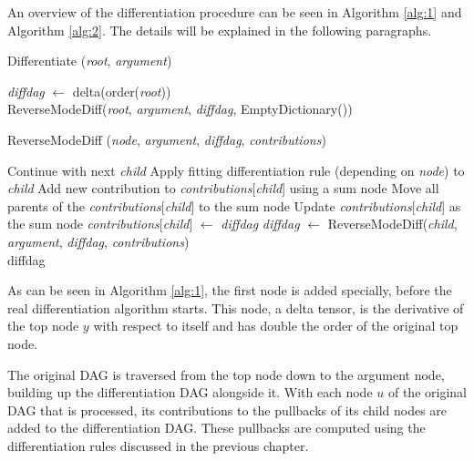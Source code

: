 \documentclass[12pt, a4paper]{report}
\begin{document}
An overview of the differentiation procedure can be seen in Algorithm \ref{alg:1} and Algorithm \ref{alg:2}.
The details will be explained in the following paragraphs.

\begin{algorithm}
    \caption{Differentiate (\textit{root}, \textit{argument})}\label{alg:1}
    \begin{algorithmic}
        \State \textit{diffdag} $\gets$ delta(order(\textit{root}))  \\
        \Return ReverseModeDiff(\textit{root}, \textit{argument}, \textit{diffdag}, EmptyDictionary())
    \end{algorithmic}
\end{algorithm}

\begin{algorithm}
    \caption{ReverseModeDiff (\textit{node}, \textit{argument}, \textit{diffdag}, \textit{contributions})}\label{alg:2}
    \begin{algorithmic}
                \State Continue with next \textit{child}
            \EndIf
            \State Apply fitting differentiation rule (depending on \textit{node}) to \textit{child}
                \State Add new contribution to \textit{contributions}[\textit{child}] using a sum node
                \State Move all parents of the \textit{contributions}[\textit{child}] to the sum node
                \State Update \textit{contributions}[\textit{child}] as the sum node
            \Else
                \State \textit{contributions}[\textit{child}] $\gets$ \textit{diffdag}
                \State \textit{diffdag} $\gets$ ReverseModeDiff(\textit{child}, \textit{argument}, \textit{diffdag}, \textit{contributions})
            \EndIf
        \EndFor \\
        \Return diffdag
    \end{algorithmic}
\end{algorithm}

As can be seen in Algorithm \ref{alg:1}, the first node is added specially, before the real differentiation algorithm starts.
This node, a delta tensor, is the derivative of the top node $y$ with respect to itself and has double the order of the original top node.

The original DAG is traversed from the top node down to the argument node, building up the differentiation DAG alongside it.
With each node $u$ of the original DAG that is processed, its contributions to the pullbacks of its child nodes are added to the differentiation DAG.
These pullbacks are computed using the differentiation rules discussed in the previous chapter.
\end{document}
